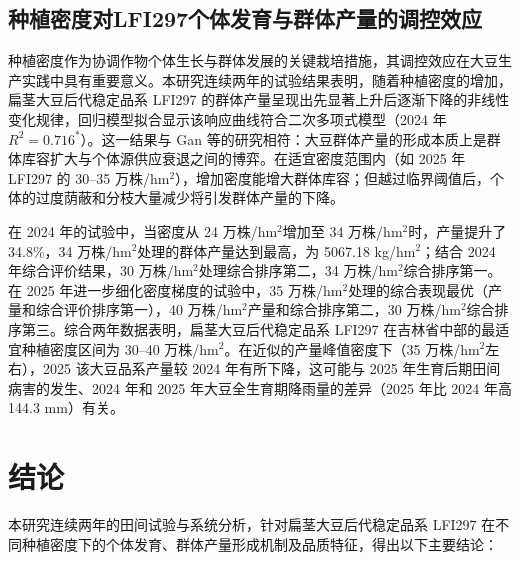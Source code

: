 \documentclass[UTF8,oneside,openany,driverfallback=dvipdfmx,pdfencoding=unicode,hidelinks]{jlutex}
\begin{document}
	\section{种植密度对LFI297个体发育与群体产量的调控效应}
	
	种植密度作为协调作物个体生长与群体发展的关键栽培措施，其调控效应在大豆生产实践中具有重要意义\cite{Lv2008}。本研究连续两年的试验结果表明，随着种植密度的增加，扁茎大豆后代稳定品系 LFI297 的群体产量呈现出先显著上升后逐渐下降的非线性变化规律，回归模型拟合显示该响应曲线符合二次多项式模型（2024 年 $R^2 = 0.716^*$）。这一结果与 Gan 等\cite{Gan2002,xu2021}的研究相符：大豆群体产量的形成本质上是群体库容扩大与个体源供应衰退之间的博弈。在适宜密度范围内（如 2025 年 LFI297 的 30--35 万株/hm$^2$），增加密度能增大群体库容；但越过临界阈值后，个体的过度荫蔽和分枝大量减少将引发群体产量的下降。
	
	在 2024 年的试验中，当密度从 24 万株/hm$^2$增加至 34 万株/hm$^2$时，产量提升了 34.8\%，34 万株/hm$^2$处理的群体产量达到最高，为 5067.18 kg/hm$^2$；结合 2024 年综合评价结果，30 万株/hm$^2$处理综合排序第二，34 万株/hm$^2$综合排序第一。在 2025 年进一步细化密度梯度的试验中，35 万株/hm$^2$处理的综合表现最优（产量和综合评价排序第一），40 万株/hm$^2$产量和综合排序第二，30 万株/hm$^2$综合排序第三。综合两年数据表明，扁茎大豆后代稳定品系 LFI297 在吉林省中部的最适宜种植密度区间为 30--40 万株/hm$^2$。在近似的产量峰值密度下（35 万株/hm$^2$左右），2025 该大豆品系产量较 2024 年有所下降，这可能与 2025 年生育后期田间病害的发生、2024 年和 2025 年大豆全生育期降雨量的差异（2025 年比 2024 年高 144.3 mm）有关。
		
	\chapter{结论}

	本研究连续两年的田间试验与系统分析，针对扁茎大豆后代稳定品系 LFI297 在不同种植密度下的个体发育、群体产量形成机制及品质特征，得出以下主要结论：

	\normalem
	\printbibliography[heading = bibintoc]

\end{document}
